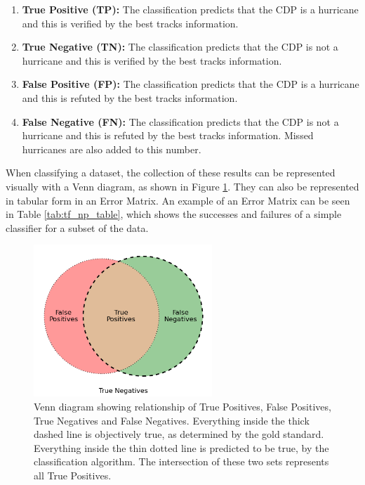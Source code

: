 \documentclass[pdftex,12pt,a4paper]{report}
\begin{document}
\begin{enumerate}
    \item \textbf{True Positive (TP):} The classification predicts that the CDP is a hurricane and
        this is verified by the best tracks information.
    \item \textbf{True Negative (TN):} The classification predicts that the CDP is not a hurricane
        and this is verified by the best tracks information.
    \item \textbf{False Positive (FP):} The classification predicts that the CDP is a hurricane and
        this is refuted by the best tracks information.
    \item \textbf{False Negative (FN):} The classification predicts that the CDP is not a hurricane
        and this is refuted by the best tracks information. Missed hurricanes are also added to this
        number.
\end{enumerate}

When classifying a dataset, the collection of these results can be represented visually with a Venn
diagram, as shown in Figure \ref{fig:tf_np_venn}. They can also be represented in tabular form in an
Error Matrix. An example of an Error Matrix
can be seen in Table \ref{tab:tf_np_table}, which shows the successes and failures of a simple
classifier for a subset of the data.


\begin{figure}[hb!]
    \centering
    \includegraphics[width=0.6\textwidth]{figures/tf_np_venn_cropped}
    \vspace{-10pt}
    \caption{Venn diagram showing relationship of True Positives, False Positives, True Negatives and
        False Negatives. Everything inside the thick dashed line is objectively true, as determined
        by the gold standard. Everything inside the thin dotted line is predicted to be true, by the
        classification algorithm. The intersection of these two sets represents all True Positives.}
    \label{fig:tf_np_venn}
    \vspace{-10pt}
\end{figure}
\end{document}
